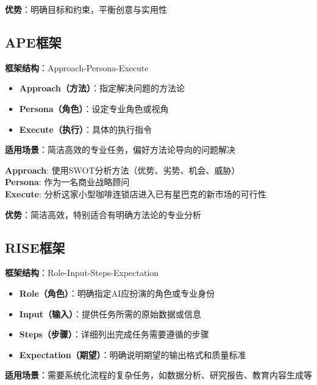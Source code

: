 \documentclass[12pt]{ctexart}
\begin{document}
\textbf{优势}：明确目标和约束，平衡创意与实用性

\subsection{APE框架}

\textbf{框架结构}：Approach-Persona-Execute

\begin{itemize}
  \item \textbf{Approach（方法）}：指定解决问题的方法论
  \item \textbf{Persona（角色）}：设定专业角色或视角
  \item \textbf{Execute（执行）}：具体的执行指令
\end{itemize}

\textbf{适用场景}：简洁高效的专业任务，偏好方法论导向的问题解决

\begin{promptbox}
\textbf{Approach}: 使用SWOT分析方法（优势、劣势、机会、威胁）\\

\textbf{Persona}: 作为一名商业战略顾问\\

\textbf{Execute}: 分析这家小型咖啡连锁店进入已有星巴克的新市场的可行性
\end{promptbox}

\textbf{优势}：简洁高效，特别适合有明确方法论的专业分析

\subsection{RISE框架}

\textbf{框架结构}：Role-Input-Steps-Expectation

\begin{itemize}
  \item \textbf{Role（角色）}：明确指定AI应扮演的角色或专业身份
  \item \textbf{Input（输入）}：提供任务所需的原始数据或信息
  \item \textbf{Steps（步骤）}：详细列出完成任务需要遵循的步骤
  \item \textbf{Expectation（期望）}：明确说明期望的输出格式和质量标准
\end{itemize}

\textbf{适用场景}：需要系统化流程的复杂任务，如数据分析、研究报告、教育内容生成等
\end{document}
